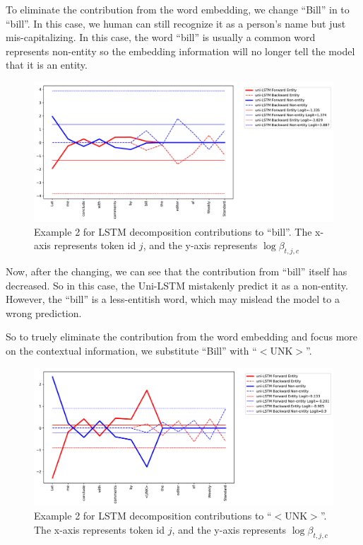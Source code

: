 \documentclass{article}
\begin{document}
To eliminate the contribution from the word embedding, we change ``Bill'' in to ``bill''. In this case, we human can still recognize it as a person's name but just mis-capitalizing. In this case, the word ``bill'' is usually a common word represents non-entity so the embedding information will no longer tell the model that it is an entity.

\begin{figure}[t]
	\centering
	\includegraphics[width=\linewidth]{uni-bill2.pdf}
	\caption{Example 2 for LSTM decomposition contributions to ``bill''. The x-axis represents token id $j$, and the y-axis represents $\log \beta_{t, j, c}$}
	\label{fig:bill}
\end{figure}

Now, after the changing, we can see that the contribution from ``bill'' itself has decreased. So in this case, the Uni-LSTM mistakenly predict it as a non-entity. However, the ``bill'' is a less-entitish word, which may mislead the model to a wrong prediction. 

So to truely eliminate the contribution from the word embedding and focus more on the contextual information, we substitute ``Bill'' with ``$<$UNK$>$''.

\begin{figure}[t]
	\centering
	\includegraphics[width=\linewidth]{uni-UNK.pdf}
	\caption{Example 2 for LSTM decomposition contributions to ``$<$UNK$>$''. The x-axis represents token id $j$, and the y-axis represents $\log \beta_{t, j, c}$}
	\label{fig:unk}
\end{figure}
\end{document}
